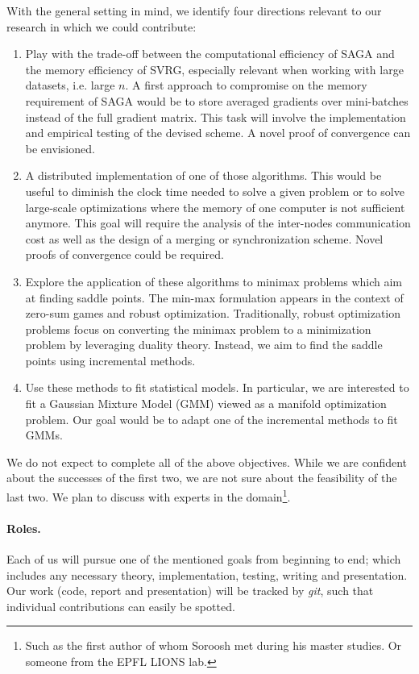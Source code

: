 \documentclass[a4paper,11pt]{article}
\begin{document}
With the general setting in mind, we identify four directions relevant to our
research in which we could contribute:
\begin{enumerate}
	\setlength{\itemsep}{0pt} \setlength{\parskip}{0pt}
	\item Play with the trade-off between the computational efficiency of SAGA
		and the memory efficiency of SVRG, especially relevant when working with
		large datasets, i.e. large $n$. A first approach to compromise on the
		memory requirement of SAGA would be to store averaged gradients over
		mini-batches instead of the full gradient matrix. This task will involve
		the implementation and empirical testing of the devised scheme. A novel
		proof of convergence can be envisioned.
	\item A distributed implementation of one of those algorithms. This would be
		useful to diminish the clock time needed to solve a given problem or to
		solve large-scale optimizations where the memory of one computer is not
		sufficient anymore. This goal will require the analysis of the
		inter-nodes communication cost as well as the design of a merging or
		synchronization scheme. Novel proofs of convergence could be required.
	\item Explore the application of these algorithms to minimax problems which
		aim at finding saddle points. The min-max formulation appears in the
		context of zero-sum games and robust optimization. Traditionally, robust
		optimization problems focus on converting the minimax problem to a
		minimization problem by leveraging duality theory. Instead, we aim to
		find the saddle points using incremental methods.
	\item Use these methods to fit statistical models. In particular, we are
		interested to fit a Gaussian Mixture Model (GMM) viewed as a manifold
		optimization problem. Our goal would be to adapt one of the incremental
		methods to fit GMMs.
\end{enumerate}
We do not expect to complete all of the above objectives. While we are confident
about the successes of the first two, we are not sure about the feasibility of
the last two. We plan to discuss with experts in the domain\footnote{Such as the first author of
\cite{reshad_matrix_2015} whom Soroosh met during his master studies. Or someone from
the EPFL LIONS lab.}.

\paragraph{Roles.}
Each of us will pursue one of the mentioned goals from beginning to end; which
includes any necessary theory, implementation, testing, writing and
presentation. Our work (code, report and presentation) will be tracked by
\textit{git}, such that individual contributions can easily be spotted.
\end{document}
